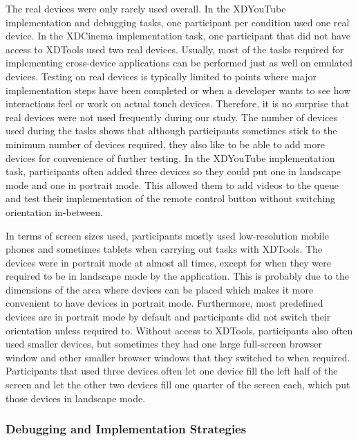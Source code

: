 The real devices were only rarely used overall. In the XDYouTube implementation and debugging tasks, one participant per condition used one real device. In the XDCinema implementation task, one participant that did not have access to XDTools used two real devices. Usually, most of the tasks required for implementing cross-device applications can be performed just as well on emulated devices. Testing on real devices is typically limited to points where major implementation steps have been completed or when a developer wants to see how interactions feel or work on actual touch devices. Therefore, it is no surprise that real devices were not used frequently during our study. The number of devices used during the tasks shows that although participants sometimes stick to the minimum number of devices required, they also like to be able to add more devices for convenience of further testing. In the XDYouTube implementation task, participants often added three devices so they could put one in landscape mode and one in portrait mode. This allowed them to add videos to the queue and test their implementation of the remote control button without switching orientation in-between. 

In terms of screen sizes used, participants mostly used low-resolution mobile phones and sometimes tablets when carrying out tasks with XDTools. The devices were in portrait mode at almost all times, except for when they were required to be in landscape mode by the application. This is probably due to the dimensions of the area where devices can be placed which makes it more convenient to have devices in portrait mode. Furthermore, most predefined devices are in portrait mode by default and participants did not switch their orientation unless required to. Without access to XDTools, participants also often used smaller devices, but sometimes they had one large full-screen browser window and other smaller browser windows that they switched to when required. Participants that used three devices often let one device fill the left half of the screen and let the other two devices fill one quarter of the screen each, which put those devices in landscape mode. 

\subsubsection{Debugging and Implementation Strategies}

